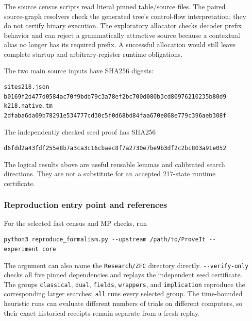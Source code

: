\documentclass[
  11pt,
]{article}
\begin{document}
The source census scripts read literal pinned table/source files. The
paired source-graph resolvers check the generated tree's control-flow
interpretation; they do not certify binary execution. The exploratory
allocator checks decoder prefix behavior and can reject a grammatically
attractive source because a contextual alias no longer has its required
prefix. A successful allocation would still leave complete startup and
arbitrary-register runtime obligations.

The two main source inputs have SHA256 digests:

\begin{verbatim}
sites218.json   b0169f2d477d0584ac70f9bdb79c3a78ef2bc700d080b3cd80976210235b80d9
k218.native.tm  2dfaba6da09b78291e534777cd30c5f0d68bd84faa670e868e779c396aeb308f
\end{verbatim}

The independently checked seed proof has SHA256

\begin{verbatim}
d6fdd2a43fdf255e8b7a3ca3c16cbaec8f7a2730e7be9b3df2c2bc803a91e052
\end{verbatim}

The logical results above are useful reusable lemmas and calibrated
search directions. They are not a substitute for an accepted 217-state
runtime certificate.

\hypertarget{reproduction-entry-point-and-references}{%
\subsubsection{Reproduction entry point and
references}\label{reproduction-entry-point-and-references}}

For the selected fast census and MP checks, run

\begin{verbatim}
python3 reproduce_formalism.py --upstream /path/to/ProveIt --experiment core
\end{verbatim}

The argument can also name the \texttt{Research/ZFC} directory directly.
\texttt{-\/-verify-only} checks all five pinned dependencies and replays
the independent seed certificate. The groups \texttt{classical},
\texttt{dual}, \texttt{fields}, \texttt{wrappers}, and
\texttt{implication} reproduce the corresponding larger searches;
\texttt{all} runs every selected group. The time-bounded heuristic runs
can evaluate different numbers of trials on different computers, so
their exact historical receipts remain separate from a fresh replay.
\end{document}
